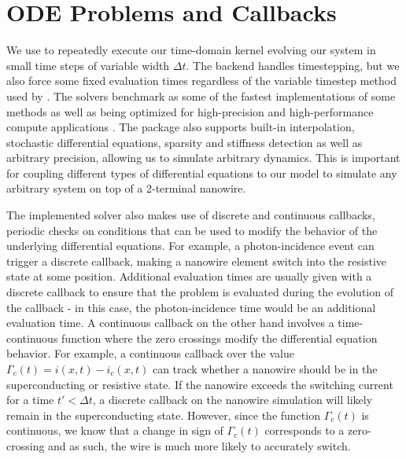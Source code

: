 \section{ODE Problems and Callbacks} \label{callbacks}

We use  to repeatedly execute our time-domain kernel evolving our
system in small time steps of variable width $\Delta t$. The  backend
handles timestepping, but we also force some fixed evaluation times regardless of the variable timestep
method used by  \cite{diffeqjl_paper}. The  solvers
benchmark as some of the fastest implementations of some methods as well as being optimized
for high-precision and high-performance compute applications \cite{differentialequationsjl, ODESolver-diffeq}.
The package also supports built-in interpolation, stochastic differential equations, sparsity and 
stiffness detection  as well as arbitrary precision, allowing us to simulate arbitrary dynamics. 
This is important for coupling different types of differential equations to our model to simulate
any arbitrary system on top of a 2-terminal nanowire.

The implemented solver also makes use of discrete and continuous callbacks, periodic checks on conditions
that can be used to modify the behavior of the underlying differential equations. For example, a photon-incidence
event can trigger a discrete callback, making a nanowire element switch into the resistive state at some position.
Additional evaluation times are usually given with a discrete callback to ensure that the problem is evaluated
during the evolution of the callback - in this case, the photon-incidence time would be an additional evaluation
time.
A continuous callback on the other hand involves a time-continuous function where the zero crossings modify
the differential equation behavior. For example, a continuous callback over the value $\Gamma_c(t) = i(x, t)-i_c(x, t)$ 
can track whether a nanowire should be in the superconducting or resistive state. If the nanowire exceeds
the switching current for a time $t' < \Delta t$, a discrete callback on the nanowire simulation will 
likely remain in the superconducting state. However, since the function $\Gamma_c(t)$ is continuous, we
know that a change in sign of $\Gamma_c(t)$ corresponds to a zero-crossing and as such, the wire is much more
likely to accurately switch.

